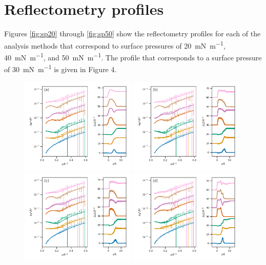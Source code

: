 \documentclass[amsmath,amssymb,superscriptaddress]{revtex4-1}
\begin{document}
\section{Reflectometry profiles}
Figures \ref{fig:sp20} through \ref{fig:sp50} show the reflectometry profiles for each of the analysis methods that correspond to surface pressures of \SI{20}{\milli\newton\per\meter}, \SI{40}{\milli\newton\per\meter}, and \SI{50}{\milli\newton\per\meter}.
The profile that corresponds to a surface pressure of \SI{30}{\milli\newton\per\meter} is given in Figure 4.
%
\begin{figure}
 \centering
 \includegraphics[width=0.49\textwidth]{trad_20}
 \includegraphics[width=0.49\textwidth]{sim_slipids_20} \\
 \includegraphics[width=0.49\textwidth]{sim_berger_20}
 \includegraphics[width=0.49\textwidth]{sim_martini_20}

\end{figure}
\end{document}
